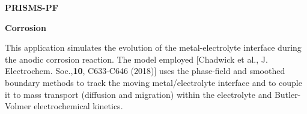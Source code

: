 \documentclass[10pt]{article}
\begin{document}
\def\Bomega{\mbox{\boldmath$\omega$}}
\def\Bvarepsilon{\mbox{\boldmath$\varepsilon$}}
\def\Bvartheta{\mbox{\boldmath$\vartheta$}}
\def\Bvarpi{\mbox{\boldmath$\varpi$}}
\def\Bvarrho{\mbox{\boldmath$\varrho$}}
\def\Bvarsigma{\mbox{\boldmath$\varsigma$}}
\def\Bvarphi{\mbox{\boldmath$\varphi$}}
\def\bone{\mathbf{1}}
\def\bzero{\mathbf{0}}
\def\bA{\mbox{\boldmath$ A$}}
\def\bB{\mbox{\boldmath$ B$}}
\def\bC{\mbox{\boldmath$ C$}}
\def\bD{\mbox{\boldmath$ D$}}
\def\bE{\mbox{\boldmath$ E$}}
\def\bF{\mbox{\boldmath$ F$}}
\def\bG{\mbox{\boldmath$ G$}}
\def\bH{\mbox{\boldmath$ H$}}
\def\bI{\mbox{\boldmath$ I$}}
\def\bJ{\mbox{\boldmath$ J$}}
\def\bK{\mbox{\boldmath$ K$}}
\def\bL{\mbox{\boldmath$ L$}}
\def\bM{\mbox{\boldmath$ M$}}
\def\bN{\mbox{\boldmath$ N$}}
\def\bO{\mbox{\boldmath$ O$}}
\def\bP{\mbox{\boldmath$ P$}}
\def\bQ{\mbox{\boldmath$ Q$}}
\def\bR{\mbox{\boldmath$ R$}}
\def\bS{\mbox{\boldmath$ S$}}
\def\bT{\mbox{\boldmath$ T$}}
\def\bU{\mbox{\boldmath$ U$}}
\def\bV{\mbox{\boldmath$ V$}}
\def\bW{\mbox{\boldmath$ W$}}
\def\bX{\mbox{\boldmath$ X$}}
\def\bY{\mbox{\boldmath$ Y$}}
\def\bZ{\mbox{\boldmath$ Z$}}
\def\ba{\mbox{\boldmath$ a$}}
\def\bb{\mbox{\boldmath$ b$}}
\def\bc{\mbox{\boldmath$ c$}}
\def\bd{\mbox{\boldmath$ d$}}
\def\be{\mbox{\boldmath$ e$}}
\def\bff{\mbox{\boldmath$ f$}}
\def\bg{\mbox{\boldmath$ g$}}
\def\bh{\mbox{\boldmath$ h$}}
\def\bi{\mbox{\boldmath$ i$}}
\def\bj{\mbox{\boldmath$ j$}}
\def\bk{\mbox{\boldmath$ k$}}
\def\bl{\mbox{\boldmath$ l$}}
\def\bm{\mbox{\boldmath$ m$}}
\def\bn{\mbox{\boldmath$ n$}}
\def\bo{\mbox{\boldmath$ o$}}
\def\bp{\mbox{\boldmath$ p$}}
\def\bq{\mbox{\boldmath$ q$}}
\def\br{\mbox{\boldmath$ r$}}
\def\bs{\mbox{\boldmath$ s$}}
\def\bt{\mbox{\boldmath$ t$}}
\def\bu{\mbox{\boldmath$ u$}}
\def\bv{\mbox{\boldmath$ v$}}
\def\bw{\mbox{\boldmath$ w$}}
\def\bx{\mbox{\boldmath$ x$}}
\def\by{\mbox{\boldmath$ y$}}
\def\bz{\mbox{\boldmath$ z$}}
\centerline{\Large{\bf PRISMS-PF}}
\smallskip
\centerline{\Large{\bf Corrosion}}
\bigskip
This application simulates the evolution of the metal-electrolyte interface during the anodic corrosion reaction. The model employed  [Chadwick et al., J. Electrochem. Soc.,{\bf 10}, C633-C646 (2018)]  uses the phase-field and smoothed boundary methods to track the moving metal/electrolyte interface and to couple it to mass transport (diffusion and migration) within the electrolyte and Butler-Volmer electrochemical kinetics.
\end{document}
